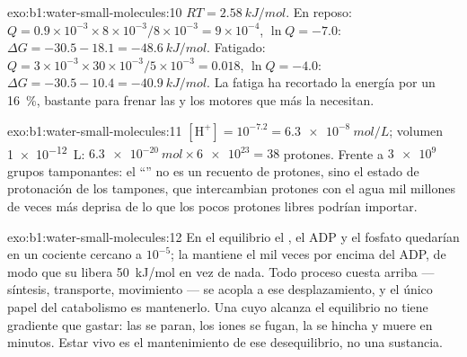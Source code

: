 \begin{solution}{exo:b1:water-small-molecules:10}
$RT = \qty{2.58}{kJ/mol}$. En reposo: $Q = 0.9\times 10^{-3}\times 8\times
10^{-3}/8\times 10^{-3} = 9\times 10^{-4}$, $\ln Q = -7.0$: $\Delta G =
-30.5 - 18.1 = \qty{-48.6}{kJ/mol}$. Fatigado: $Q = 3\times 10^{-3}\times
30\times 10^{-3}/5\times 10^{-3} = 0.018$, $\ln Q = -4.0$: $\Delta G =
-30.5 - 10.4 = \qty{-40.9}{kJ/mol}$. La fatiga ha recortado la energía por
 un \qty{16}{\%}, bastante para frenar las  y los motores que más
la necesitan.
\end{solution}

\begin{solution}{exo:b1:water-small-molecules:11}
$[\mathrm{H^+}] = 10^{-7.2} = \qty{6.3e-8}{mol/L}$; volumen
\qty{1e-12}{L}: $\qty{6.3e-20}{mol}\times\num{6e23} = 38$ protones. Frente a
$\num{3e9}$ grupos tamponantes: el ``'' no es un recuento de protones,
sino el estado de protonación de los tampones, que intercambian protones con
el agua mil millones de veces más deprisa de lo que los pocos protones
libres podrían importar.
\end{solution}

\begin{solution}{exo:b1:water-small-molecules:12}
En el equilibrio el , el ADP y el fosfato quedarían en un cociente
cercano a $10^{-5}$; la  mantiene el  mil veces por encima del ADP,
de modo que su  libera \qty{50}{kJ/mol} en vez de nada. Todo
proceso cuesta arriba --- síntesis, transporte, movimiento --- se acopla a
ese desplazamiento, y el único papel del catabolismo es mantenerlo. Una
 cuyo  alcanza el equilibrio no tiene gradiente que gastar: las
 se paran, los iones se fugan, la  se hincha y muere en minutos.
Estar vivo es el mantenimiento de ese desequilibrio, no una sustancia.
\end{solution}

